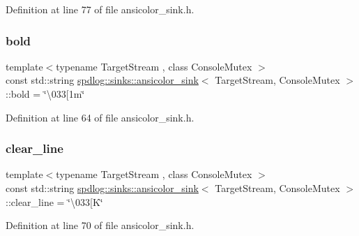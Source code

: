Definition at line 77 of file ansicolor\+\_\+sink.\+h.

\mbox{\label{classspdlog_1_1sinks_1_1ansicolor__sink_ab3b3847f7cfac7e21e5a4300ef0295f0}} 
\subsubsection{\texorpdfstring{bold}{bold}}
{\footnotesize\ttfamily template$<$typename Target\+Stream , class Console\+Mutex $>$ \\
const std\+::string \hyperlink{classspdlog_1_1sinks_1_1ansicolor__sink}{spdlog\+::sinks\+::ansicolor\+\_\+sink}$<$ Target\+Stream, Console\+Mutex $>$\+::bold = \char`\"{}\textbackslash{}033\mbox{[}1m\char`\"{}}



Definition at line 64 of file ansicolor\+\_\+sink.\+h.

\mbox{\label{classspdlog_1_1sinks_1_1ansicolor__sink_aa52fbe671a7c1fbeaf784b8a325745c6}} 
\subsubsection{\texorpdfstring{clear\+\_\+line}{clear\_line}}
{\footnotesize\ttfamily template$<$typename Target\+Stream , class Console\+Mutex $>$ \\
const std\+::string \hyperlink{classspdlog_1_1sinks_1_1ansicolor__sink}{spdlog\+::sinks\+::ansicolor\+\_\+sink}$<$ Target\+Stream, Console\+Mutex $>$\+::clear\+\_\+line = \char`\"{}\textbackslash{}033\mbox{[}K\char`\"{}}



Definition at line 70 of file ansicolor\+\_\+sink.\+h.

\mbox{\label{classspdlog_1_1sinks_1_1ansicolor__sink_a681736d8ce3d3551bdb51e053a839fc3}} 
